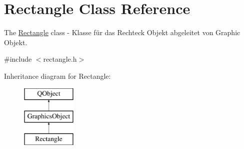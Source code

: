 \hypertarget{class_rectangle}{}\section{Rectangle Class Reference}
\label{class_rectangle}


The \hyperlink{class_rectangle}{Rectangle} class -\/ Klasse für das Rechteck Objekt abgeleitet von Graphic Objekt.  




{\ttfamily \#include $<$rectangle.\+h$>$}

Inheritance diagram for Rectangle\+:\begin{figure}[H]
\begin{center}
\leavevmode
\includegraphics[height=3.000000cm]{class_rectangle}
\end{center}
\end{figure}
